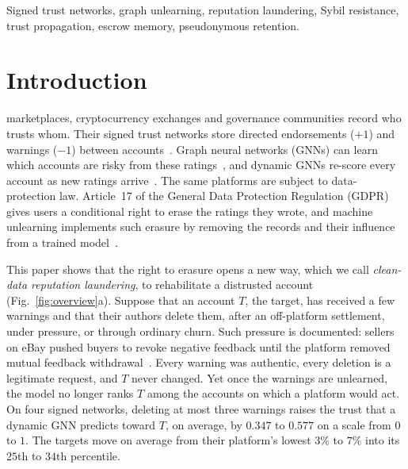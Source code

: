 \documentclass[lettersize,journal]{IEEEtran}
\begin{document}
\begin{IEEEkeywords}
Signed trust networks, graph unlearning, reputation laundering, Sybil resistance, trust propagation, escrow memory, pseudonymous retention.
\end{IEEEkeywords}


\section{Introduction}
\label{sec:intro}

 marketplaces, cryptocurrency exchanges and governance communities record who trusts whom.
Their signed trust networks store directed endorsements ($+1$) and warnings ($-1$) between accounts~\cite{kumar2016edge,kumar2018rev2,west2014exploiting}. Graph neural networks (GNNs) can learn which accounts are risky from these ratings~\cite{derr2018signed}, and dynamic GNNs re-score every account as new ratings arrive~\cite{rossi2020temporal}.
The same platforms are subject to data-protection law.
Article~17 of the General Data Protection Regulation (GDPR)~\cite{gdpr2016} gives users a conditional right to erase the ratings they wrote, and machine unlearning implements such erasure by removing the records and their influence from a trained model~\cite{cao2015towards,bourtoule2021machine,chen2022graph}.

This paper shows that the right to erasure opens a new way, which we call \emph{clean-data reputation laundering}, to rehabilitate a distrusted account (Fig.~\ref{fig:overview}a).
Suppose that an account $T$, the target, has received a few warnings and that their authors delete them, after an off-platform settlement, under pressure, or through ordinary churn.
Such pressure is documented: sellers on eBay pushed buyers to revoke negative feedback until the platform removed mutual feedback withdrawal~\cite{ye2014strategic}.
Every warning was authentic, every deletion is a legitimate request, and $T$ never changed.
Yet once the warnings are unlearned, the model no longer ranks $T$ among the accounts on which a platform would act.
On four signed networks, deleting at most three warnings raises the trust that a dynamic GNN predicts toward $T$, on average, by $0.347$ to $0.577$ on a scale from $0$ to $1$.
The targets move on average from their platform's lowest $3\%$ to $7\%$ into its $25$th to $34$th percentile.
\end{document}
